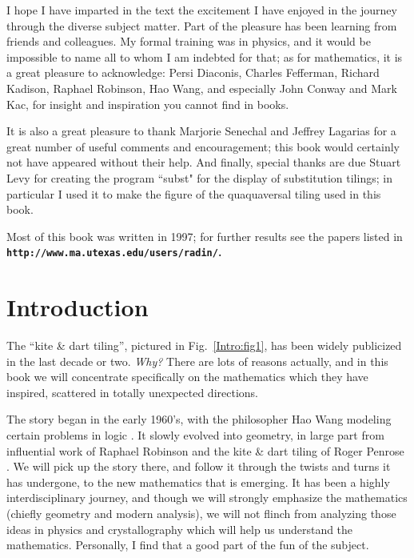 \documentclass[reqno]{stml-l}
\theoremstyle{plain}
\theoremstyle{definition}
\numberwithin{equation}{chapter}
\begin{document}
I hope I have imparted in the text the excitement I have enjoyed in the journey through the diverse subject matter. Part of the pleasure has been learning from friends and colleagues. My formal training was in physics, and it would be impossible to name all to whom I am indebted for that; as for mathematics, it is a great pleasure to acknowledge: Persi Diaconis, Charles Fefferman, Richard Kadison, Raphael Robinson, Hao Wang, and especially John Conway and Mark Kac, for insight and inspiration you cannot find in books.

It is also a great pleasure to thank Marjorie Senechal and Jeffrey Lagarias for a great number of useful comments and encouragement; this book would certainly not have appeared without their help. And finally, special thanks are due Stuart Levy for creating the program ``subst" for the display of substitution tilings; in particular I used it to make the figure of the quaquaversal tiling used in this book.

Most of this book was written in 1997; for further results see the papers listed in \textbf{\texttt{http://www.ma.utexas.edu/users/radin/}.}


\mainmatter

\chapter*{Introduction}

The ``kite \& dart tiling'', pictured in Fig.~\ref{Intro:fig1}, has been widely publicized in the last decade or two. \emph{Why?} There are lots of reasons actually, and in this book we will concentrate specifically on the mathematics which they have inspired, scattered in totally unexpected directions.

The story began in the early 1960's, with the philosopher Hao Wang modeling certain problems in logic \cite{bib:Wan}. It slowly evolved into geometry, in large part from influential work of Raphael Robinson \cite{bib:Rob} and the kite \& dart tiling of Roger Penrose \cite{bib:Gar}. We will pick up the story there, and follow it through the twists and turns it has undergone, to the new mathematics that is emerging. It has been a highly interdisciplinary journey, and though we will strongly emphasize the mathematics (chiefly geometry and modern analysis), we will not flinch from analyzing those ideas in physics and crystallography which will help us understand the mathematics. Personally, I find that a good part of the fun of the subject.
\end{document}
